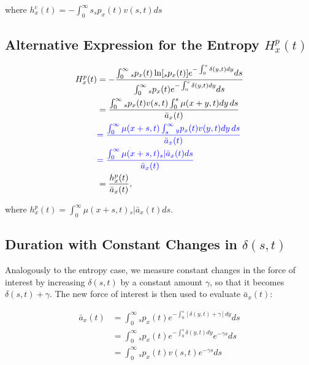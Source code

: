 \documentclass[12pt]{article}
\newcommand{\revision}[1]{\textcolor{blue}{#1}}
\begin{document}
where ${h}^{c}_x(t)=-\int_0^\infty s {}_sp_x(t) {v}(s,t)ds$

\color{black}

\subsection{Alternative Expression for the Entropy ${H}^{p}_{x}(t)$}\label{sec:EntropyAlt}

\begin{equation} \label{eq:EntropyAnnuityA1}
\begin{split}
{H}^{p}_{x}(t) & = -\frac{ \int_{0}^{\infty}{}_sp_x(t)\ln[{}_sp_x(t)] e^{-\int_{0}^{s}\delta(y,t)dy} ds}{\int_0^\infty {}_sp_x(t) e^{-\int_{0}^{s}\delta(y,t)dy} ds}\\
&= \frac{\int_0^\infty {}_sp_x(t) {v}(s,t) \int_0^s \mu(x+y,t) dy\,ds}{\bar{a}_x(t)}\\
&\revision{= \frac{\int_0^\infty  \mu(x+s,t) \int_s^\infty {}_yp_x(t) {v}(y,t)  dy\,ds}{\bar{a}_x(t)}}\\
&\revision{=  \frac{\int_0^\infty \mu(x+s,t)  {}_s|\bar{a}_x(t) ds}{\bar{a}_x(t)}} \\
&=  \frac{{h}^{p}_{x}(t)}{\bar{a}_x(t)}, \\
\end{split}
\end{equation}

where ${h}^{p}_{x}(t)=\int_0^\infty \mu(x+s,t)   {}_s|\bar{a}_x(t) ds$.



\subsection{Duration with Constant Changes in $\delta(s,t)$}\label{sec:DurConst}

\color{blue}Analogously to the entropy case, we measure constant changes in the force of interest by increasing $\delta(s,t)$ by a constant amount $\gamma$, so that it becomes $\delta(s,t)+\gamma$. The new force of interest is then used to evaluate $\bar{a}_{x}(t)$: \color{black}


\begin{equation}\label{eq:DurationConst1}
\begin{split}
\bar{a}_{x}(t) &= \int_0^\infty {}_sp_x(t) e^{- \int_{0}^{s} [\delta(y,t)+\gamma]dy}ds \\
&= \int_0^\infty {}_sp_x(t) e^{- \int_{0}^{s}\delta(y,t)dy}e^{-\gamma s}ds \\
&= \int_0^\infty {}_sp_x(t) {v}(s,t)e^{-\gamma s}ds
\end{split}
\end{equation}
\end{document}
